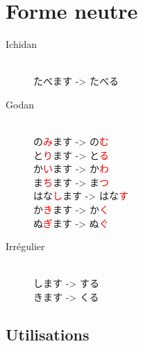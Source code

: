 \documentclass[11pt]{report}
\newenvironment{Japanese}{%
\CJKfamily{min}%
\CJKtilde  
\CJKnospace}{}
\begin{document}
\section{Forme neutre}

\begin{CJK}{UTF8}{}  
\begin{Japanese}
	\begin{description}
		\item[Ichidan] \hfill \\
			たべます -> たべる
		\item[Godan] \hfill \\
			の\textcolor{red}{み}ます -> の\textcolor{red}{む} \\
			と\textcolor{red}{り}ます -> と\textcolor{red}{る} \\
			か\textcolor{red}{い}ます -> か\textcolor{red}{わ} \\
			ま\textcolor{red}{ち}ます -> ま\textcolor{red}{つ} \\
			はな\textcolor{red}{し}ます -> はな\textcolor{red}{す} \\
			か\textcolor{red}{き}ます -> か\textcolor{red}{く} \\
			ぬ\textcolor{red}{ぎ}ます -> ぬ\textcolor{red}{ぐ}
		\item[Irrégulier] \hfill \\
			します -> する \\
			きます -> くる
	\end{description}
\end{Japanese}  
\end{CJK}

\subsection{Utilisations}
\end{document}

